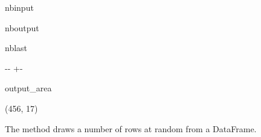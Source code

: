 \documentclass[letterpaper,10pt,english]{sphinxmanual}
\newlength\nbsphinxcodecellspacing
\begin{document}
\begin{sphinxuseclass}{nbinput}
{
\begin{sphinxVerbatim}[commandchars=\\\{\}]
\llap{\color{nbsphinxin}[6]:\,\hspace{\fboxrule}\hspace{\fboxsep}}
\end{sphinxVerbatim}
}

\end{sphinxuseclass}
\begin{sphinxuseclass}{nboutput}
\begin{sphinxuseclass}{nblast}
{

\kern-\sphinxverbatimsmallskipamount\kern-\baselineskip
\kern+\FrameHeightAdjust\kern-\fboxrule
\vspace{\nbsphinxcodecellspacing}

\begin{sphinxuseclass}{output_area}
\begin{sphinxuseclass}{}


\begin{sphinxVerbatim}[commandchars=\\\{\}]
\llap{\color{nbsphinxout}[6]:\,\hspace{\fboxrule}\hspace{\fboxsep}}(456, 17)
\end{sphinxVerbatim}



\end{sphinxuseclass}
\end{sphinxuseclass}
}

\end{sphinxuseclass}
\end{sphinxuseclass}
\sphinxAtStartPar
The  method draws a number of rows at random from a DataFrame.
\end{document}
